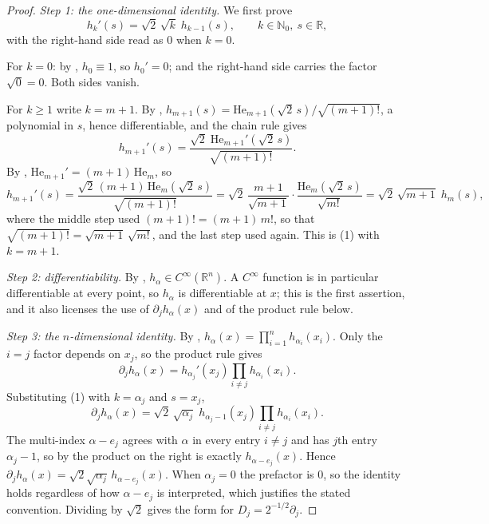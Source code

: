 \begin{proof}
\emph{Step 1: the one-dimensional identity.}
We first prove
\begin{equation*}
  h_k'(s) = \sqrt2\,\sqrt{k}\; h_{k-1}(s),
  \qquad k \in \mathbb{N}_0,\ s \in \mathbb{R}, \tag{1}
\end{equation*}
with the right-hand side read as $0$ when $k = 0$.

For $k = 0$: by , $h_0 \equiv 1$, so $h_0' = 0$; and the
right-hand side carries the factor $\sqrt{0} = 0$.  Both sides vanish.

For $k \geq 1$ write $k = m+1$.  By ,
$h_{m+1}(s) = \mathrm{He}_{m+1}(\sqrt2\,s)/\sqrt{(m+1)!}$, a polynomial in $s$, hence
differentiable, and the chain rule gives
\[
  h_{m+1}'(s) = \frac{\sqrt2\;\mathrm{He}_{m+1}'(\sqrt2\,s)}{\sqrt{(m+1)!}} .
\]
By , $\mathrm{He}_{m+1}' = (m+1)\,\mathrm{He}_m$, so
\[
  h_{m+1}'(s)
    = \frac{\sqrt2\,(m+1)\,\mathrm{He}_m(\sqrt2\,s)}{\sqrt{(m+1)!}}
    = \sqrt2\,\frac{m+1}{\sqrt{m+1}}\cdot
        \frac{\mathrm{He}_m(\sqrt2\,s)}{\sqrt{m!}}
    = \sqrt2\,\sqrt{m+1}\; h_m(s),
\]
where the middle step used $(m+1)! = (m+1)\,m!$, so that
$\sqrt{(m+1)!} = \sqrt{m+1}\,\sqrt{m!}$, and the last step used
 again.  This is (1) with $k = m+1$.

\emph{Step 2: differentiability.}
By , $h_\alpha \in C^\infty(\mathbb{R}^n)$.  A
$C^\infty$ function is in particular differentiable at every point, so
$h_\alpha$ is differentiable at $x$; this is the first assertion, and it also
licenses the use of $\partial_j h_\alpha(x)$ and of the product rule below.

\emph{Step 3: the $n$-dimensional identity.}
By , $h_\alpha(x) = \prod_{i=1}^n h_{\alpha_i}(x_i)$.  Only
the $i = j$ factor depends on $x_j$, so the product rule gives
\[
  \partial_j h_\alpha(x)
    = h_{\alpha_j}'(x_j) \prod_{i \neq j} h_{\alpha_i}(x_i) .
\]
Substituting (1) with $k = \alpha_j$ and $s = x_j$,
\[
  \partial_j h_\alpha(x)
    = \sqrt2\,\sqrt{\alpha_j}\;
      h_{\alpha_j - 1}(x_j) \prod_{i \neq j} h_{\alpha_i}(x_i) .
\]
The multi-index $\alpha - e_j$ agrees with $\alpha$ in every entry $i \neq j$ and
has $j$th entry $\alpha_j - 1$, so by  the product on the
right is exactly $h_{\alpha-e_j}(x)$.  Hence
$\partial_j h_\alpha(x) = \sqrt2\sqrt{\alpha_j}\, h_{\alpha-e_j}(x)$.  When
$\alpha_j = 0$ the prefactor is $0$, so the identity holds regardless of how
$\alpha - e_j$ is interpreted, which justifies the stated convention.  Dividing
by $\sqrt2$ gives the form for $D_j = 2^{-1/2}\partial_j$.
\end{proof}
